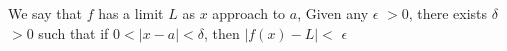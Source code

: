 \documentclass[preview]{standalone}
\begin{document}
\begin{center}
We say that $f$ has a limit $L$ as $x$ approach to $a$, Given any $\epsilon$ $ > 0$, there exists $\delta$ $ > 0$ such that if $0 < |x - a| < \delta$, then $|f(x) - L| <$ $\epsilon$
\end{center}
\end{document}
